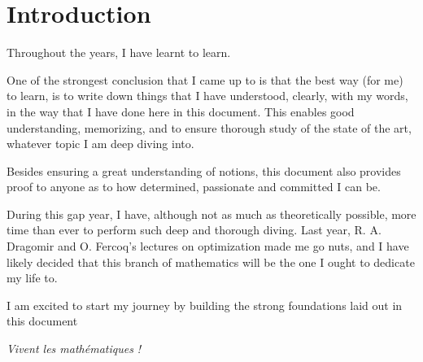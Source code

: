 \chapter*{Introduction}
\pagestyle{fancy}

Throughout the years, I have learnt to learn. 

One of the strongest conclusion that I came up to is that the best way (for me) to learn, is to write down things that I have understood, clearly, with my words, in the way that I have done here in this document. This enables good understanding, memorizing, and to ensure thorough study of the state of the art, whatever topic I am deep diving into.

Besides ensuring a great understanding of notions, this document also provides proof to anyone as to how determined, passionate and committed I can be.

During this gap year, I have, although not as much as theoretically possible, more time than ever to perform such deep and thorough diving. Last year, R. A. Dragomir and  O. Fercoq's lectures on optimization made me go nuts, and I have likely decided that this branch of mathematics will be the one I ought to dedicate my life to.

I am excited to start my journey by building the strong foundations laid out in this document

\textit{Vivent les mathématiques !}

